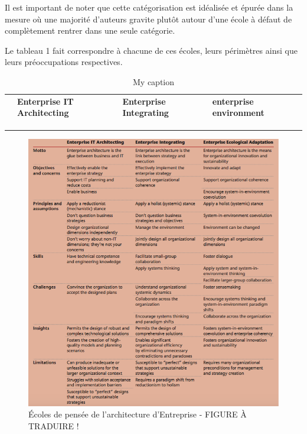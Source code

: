 Il est important de noter que cette catégorisation est idéalisée et épurée dans 
la mesure où une majorité d'auteurs gravite plutôt autour d'une école à défaut 
de complètement rentrer dans une seule catégorie. 

Le tableau 1 fait correspondre à chacune de ces écoles, leurs périmètres ainsi 
que leurs préoccupations respectives. 

\begin{table}[]
\centering
\caption{My caption}
\label{EAschools}
\begin{tabular}{llll}
		 & \small{\textbf{Enterprise IT Architecting}} & \textbf{Enterprise 
Integrating} & \textbf{enterprise environment} \\
 		 &           &           &              \\
 		 &           &           &              \\
		 &           &           &          
\end{tabular}
\end{table}

\begin{figure}[!htbp]
 \begin{center}
   \includegraphics[width=1\textwidth]{images/Chapitre1/ea_schools.png}
 \end{center}
 \caption{Écoles de pensée de l'architecture d'Entreprise 
\protect\cite{lapalme2012three} - FIGURE À TRADUIRE !}
 \label{fig:composantTransfo}
\end{figure}

